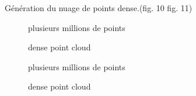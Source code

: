 \documentclass[a4paper,10pt,french]{sphinxhowto}
\begin{document}
Génération du nuage de points dense.(fig. 10 fig. 11)
\begin{figure}[htbp]
\centering
\capstart

\caption{dense point cloud}{\small 
plusieurs millions de points
}\end{figure}
\begin{figure}[htbp]
\centering
\capstart

\caption{dense point cloud}{\small 
plusieurs millions de points
}\end{figure}
\end{document}

